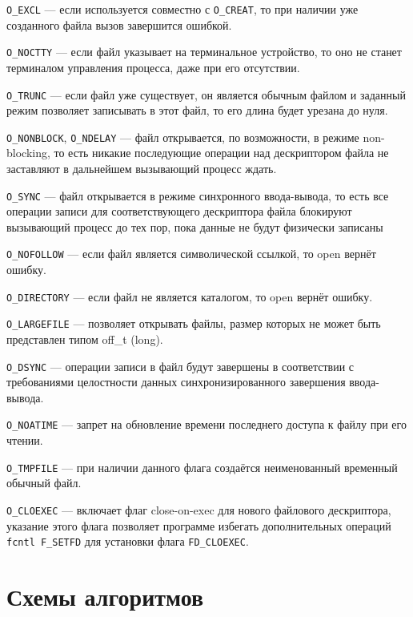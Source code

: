 \texttt{O\_EXCL} --- если используется совместно с \texttt{O\_CREAT}, то при
наличии уже созданного файла вызов завершится ошибкой.

\texttt{O\_NOCTTY} --- если файл указывает на терминальное устройство, то оно не
станет терминалом управления процесса, даже при его отсутствии.

\texttt{O\_TRUNC} --- если файл уже существует, он является обычным файлом и
заданный режим позволяет записывать в этот файл, то его длина будет урезана до
нуля.

\texttt{O\_NONBLOCK}, \texttt{O\_NDELAY} --- файл открывается, по возможности, в
режиме non-blocking, то есть никакие последующие операции над дескриптором файла
не заставляют в дальнейшем вызывающий процесс ждать.

\texttt{O\_SYNC} ---  файл открывается в режиме синхронного ввода-вывода, то
есть все операции записи для соответствующего дескриптора файла блокируют
вызывающий процесс до тех пор, пока данные не будут физически записаны

\texttt{O\_NOFOLLOW} --- если файл является символической ссылкой, то open
вернёт ошибку.

\texttt{O\_DIRECTORY} --- если файл не является каталогом, то open вернёт
ошибку.

\texttt{O\_LARGEFILE} --- позволяет открывать файлы, размер которых не может
быть представлен типом off\_t (long).

\texttt{O\_DSYNC} ---  операции записи в файл будут завершены в соответствии с
требованиями целостности данных синхронизированного завершения ввода-вывода.

\texttt{O\_NOATIME} ---  запрет на обновление времени последнего доступа к файлу
при его чтении.

\texttt{O\_TMPFILE} --- при наличии данного флага создаётся неименованный
временный обычный файл.

\texttt{O\_CLOEXEC} --- включает флаг close-on-exec для нового файлового
дескриптора, указание этого флага позволяет программе избегать дополнительных
операций \texttt{fcntl F\_SETFD} для установки флага \texttt{FD\_CLOEXEC}.

\clearpage

\section{Схемы алгоритмов}

